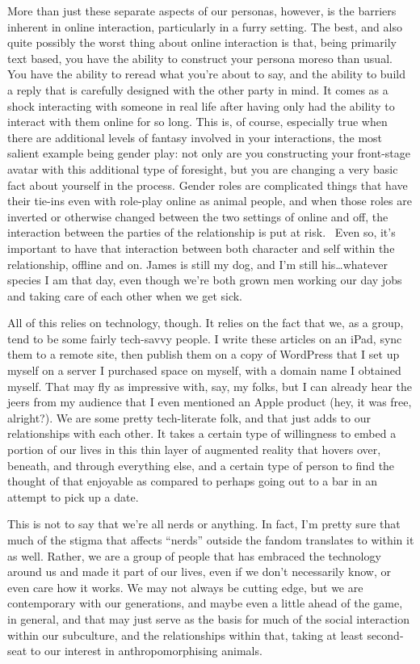 More than just these separate aspects of our personas, however, is the
barriers inherent in online interaction, particularly in a furry
setting. The best, and also quite possibly the worst thing about online
interaction is that, being primarily text based, you have the ability to
construct your persona moreso than usual. You have the ability to reread
what you're about to say, and the ability to build a reply that is
carefully designed with the other party in mind. It comes as a shock
interacting with someone in real life after having only had the ability
to interact with them online for so long. This is, of course, especially
true when there are additional levels of fantasy involved in your
interactions, the most salient example being gender play: not only are
you constructing your front-stage avatar with this additional type of
foresight, but you are changing a very basic fact about yourself in the
process. Gender roles are complicated things that have their tie-ins
even with role-play online as animal people, and when those roles are
inverted or otherwise changed between the two settings of online and
off, the interaction between the parties of the relationship is put at
risk. ~Even so, it's important to have that interaction between both
character and self within the relationship, offline and on. James is
still my dog, and I'm still his\ldots{}whatever species I am that day,
even though we're both grown men working our day jobs and taking care of
each other when we get sick.

All of this relies on technology, though. It relies on the fact that we,
as a group, tend to be some fairly tech-savvy people. I write these
articles on an iPad, sync them to a remote site, then publish them on a
copy of WordPress that I set up myself on a server I purchased space on
myself, with a domain name I obtained myself. That may fly as impressive
with, say, my folks, but I can already hear the jeers from my audience
that I even mentioned an Apple product (hey, it was free, alright?). We
are some pretty tech-literate folk, and that just adds to our
relationships with each other. It takes a certain type of willingness to
embed a portion of our lives in this thin layer of augmented reality
that hovers over, beneath, and through everything else, and a certain
type of person to find the thought of that enjoyable as compared to
perhaps going out to a bar in an attempt to pick up a date.

This is not to say that we're all nerds or anything. In fact, I'm pretty
sure that much of the stigma that affects ``nerds'' outside the fandom
translates to within it as well. Rather, we are a group of people that
has embraced the technology around us and made it part of our lives,
even if we don't necessarily know, or even care how it works. We may not
always be cutting edge, but we are contemporary with our generations,
and maybe even a little ahead of the game, in general, and that may just
serve as the basis for much of the social interaction within our
subculture, and the relationships within that, taking at least
second-seat to our interest in anthropomorphising animals.

